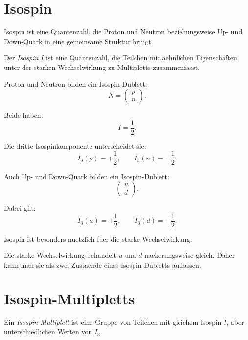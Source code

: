 \section{Isospin}

Isospin ist eine Quantenzahl, die Proton und Neutron beziehungsweise Up- und
Down-Quark in eine gemeinsame Struktur bringt.

\begin{definitionbox}
Der \emph{Isospin} $I$ ist eine Quantenzahl, die Teilchen mit aehnlichen Eigenschaften
unter der starken Wechselwirkung zu Multipletts zusammenfasst.
\end{definitionbox}

\begin{conceptbox}
Proton und Neutron bilden ein Isospin-Dublett:
\[
    N=
    \begin{pmatrix}
        p \\
        n
    \end{pmatrix}.
\]

Beide haben:
\[
    I=\frac{1}{2}.
\]

Die dritte Isospinkomponente unterscheidet sie:
\[
    I_3(p)=+\frac{1}{2},
    \qquad
    I_3(n)=-\frac{1}{2}.
\]
\end{conceptbox}

\begin{conceptbox}
Auch Up- und Down-Quark bilden ein Isospin-Dublett:
\[
    \begin{pmatrix}
        u \\
        d
    \end{pmatrix}.
\]

Dabei gilt:
\[
    I_3(u)=+\frac{1}{2},
    \qquad
    I_3(d)=-\frac{1}{2}.
\]
\end{conceptbox}

\begin{examtipbox}
Isospin ist besonders nuetzlich fuer die starke Wechselwirkung.

Die starke Wechselwirkung behandelt $u$ und $d$ naeherungsweise gleich.
Daher kann man sie als zwei Zustaende eines Isospin-Dubletts auffassen.
\end{examtipbox}

\section{Isospin-Multipletts}

\begin{definitionbox}
Ein \emph{Isospin-Multiplett} ist eine Gruppe von Teilchen mit gleichem Isospin $I$,
aber unterschiedlichen Werten von $I_3$.
\end{definitionbox}

